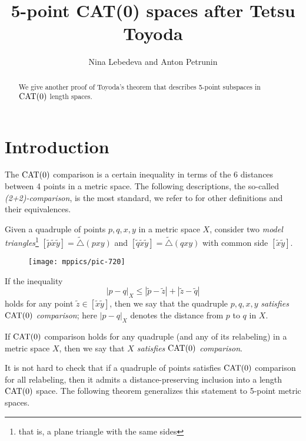 \documentclass{article}
\begin{document}


\title{5-point CAT(0) spaces after Tetsu Toyoda}
\author{Nina Lebedeva and Anton Petrunin}
\date{}
\maketitle
\begin{abstract}
We give another proof of Toyoda's theorem that describes 5-point subspaces in $\mathrm{CAT}(0)$ length spaces.
\end{abstract}


\section{Introduction}

The $\mathrm{CAT}(0)$ comparison is a certain inequality in terms of the 6 distances between 4 points in a metric space.
The following descriptions, the so-called \emph{(2+2)-comparison}, is the most standard,
we refer to \cite{alexander-kapovitch-petrunin-2019,alexander-kapovitch-petrunin-2021} for other definitions and their equivalences.

Given a quadruple of points $p,q,x,y$ in a metric space $X$,
consider two \emph{model triangles}\footnote{that is, a plane triangle with the same sides}
$[\tilde p\tilde x\tilde y]=\tilde\triangle(pxy)$ 
and 
$[\tilde q\tilde x\tilde y]=\tilde\triangle(qxy)$ with common side $[\tilde x\tilde y]$.

\begin{wrapfigure}{r}{25mm}
\vskip-4mm
\centering
\texttt{[image: mppics/pic-720]}
\end{wrapfigure}

If the inequality
\[|p-q|_X\le |\tilde p-\tilde z|+|\tilde z-\tilde q|\]
holds for any point $\tilde z\in [\tilde x\tilde y]$, then we say that 
the quadruple $p,q,x,y$ \emph{satisfies $\mathrm{CAT}(0)$ comparison};
here $|p-q|_X$ denotes the distance from $p$ to $q$ in $X$.

If $\mathrm{CAT}(0)$ comparison holds for any quadruple (and any of its relabeling) in a metric space $X$,
then we say that \emph{$X$ satisfies $\mathrm{CAT}(0)$ comparison}.


It is not hard to check that if a quadruple of points satisfies $\mathrm{CAT}(0)$ comparison for all relabeling,
then it admits a distance-preserving inclusion into a length $\mathrm{CAT}(0)$ space.
The following theorem generalizes this statement to 5-point metric spaces.
\end{document}
